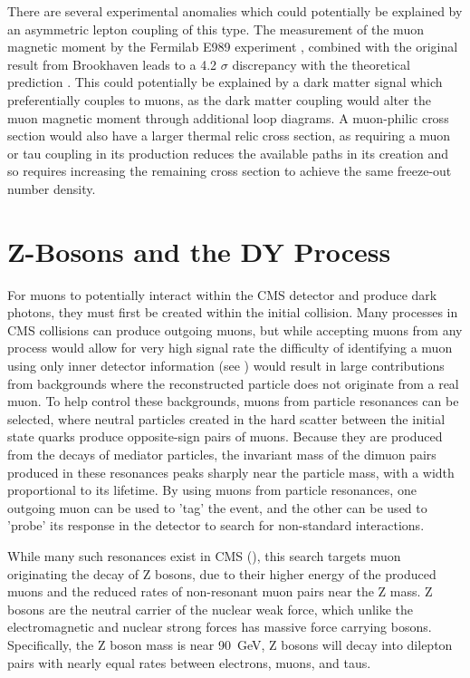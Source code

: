 There are several experimental anomalies which could potentially be explained by an asymmetric lepton coupling of this type.
The measurement of the muon magnetic moment by the Fermilab E989 experiment \cite{gminus2}, combined with the original result from Brookhaven \cite{gminus2_bnl} leads to a 4.2 $\sigma$ discrepancy with the theoretical prediction \cite{gminus2_theory}. 
This could potentially be explained by a dark matter signal which preferentially couples to muons, as the dark matter coupling would alter the muon magnetic moment through additional loop diagrams.
A muon-philic cross section would also have a larger thermal relic cross section, as requiring a muon or tau coupling in its production reduces the available paths in its creation and so requires increasing the remaining cross section to achieve the same freeze-out number density.

\section{Z-Bosons and the DY Process}
For muons to potentially interact within the CMS detector and produce dark photons, they must first be created within the initial collision.
Many processes in CMS collisions can produce outgoing muons, but while accepting muons from any process would allow for very high signal rate the difficulty of identifying a muon using only inner detector information (see ) would result in large contributions from backgrounds where the reconstructed particle does not originate from a real muon.
To help control these backgrounds, muons from particle resonances can be selected, where neutral particles created in the hard scatter between the initial state quarks produce opposite-sign pairs of muons.
Because they are produced from the decays of mediator particles, the invariant mass of the dimuon pairs produced in these resonances peaks sharply near the particle mass, with a width proportional to its lifetime. 
By using muons from particle resonances, one outgoing muon can be used to 'tag' the event, and the other can be used to 'probe' its response in the detector to search for non-standard interactions. 

While many such resonances exist in CMS (), this search targets muon originating the decay of Z bosons, due to their higher energy of the produced muons and the reduced rates of non-resonant muon pairs near the Z mass.
Z bosons are the neutral carrier of the nuclear weak force, which unlike the electromagnetic and nuclear strong forces has massive force carrying bosons.
Specifically, the Z boson mass is near \SI{90}{\giga\eV}, 
Z bosons will decay into dilepton pairs with nearly equal rates between electrons, muons, and taus. 

